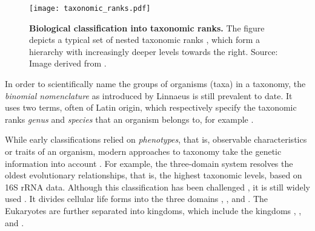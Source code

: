 \begin{figure}[hpbt]
    \centering
    \texttt{[image: taxonomic\_ranks.pdf]}
    \caption[Biological classification into taxonomic ranks]{
        \textbf{Biological classification into taxonomic ranks.}
        The figure depicts a typical set of nested taxonomic ranks \cite{Woese1990},
        which form a hierarchy with increasingly deeper levels towards the right.
        Source: Image derived from \cite{Halasz2007}.
    }
    \label{fig:taxonomic_ranks}
\end{figure}

In order to scientifically name the groups of organisms (taxa) in a taxonomy,
the \emph{binomial nomenclature} as introduced by Linnaeus is still prevalent to date.
It uses two terms, often of Latin origin,
which respectively specify the taxonomic ranks \emph{genus} and \emph{species} that an organism belongs to,
for example .

While early classifications relied on \emph{phenotypes}, that is, observable characteristics or traits of an organism,
modern approaches to taxonomy take the genetic information into account \cite{Mayr2002}.
For example, the three-domain system \cite{Woese1977,Woese1990} resolves the oldest evolutionary relationships,
that is, the highest taxonomic levels, based on 16S rRNA data.
Although this classification has been challenged \cite{Gupta1998,Mayr1998,Cavalier-Smith2002},
it is still widely used \cite{Hug2016}.
It divides cellular life forms into the three domains , , and .
The Eukaryotes are further separated into kingdoms,
which include the kingdoms , , and .




